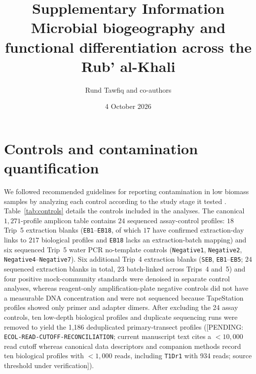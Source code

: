 \documentclass[11pt]{article}
\title{Supplementary Information\\
\large Microbial biogeography and functional differentiation across the Rub' al-Khali}
\author{Rund Tawfiq and co-authors}
\date{4 October 2026}
\begin{document}
\maketitle

\section{Controls and contamination quantification}\label{sup:controls}
We followed recommended guidelines for reporting contamination in low biomass samples by analyzing each control according to the study stage it tested \cite{fierer2025controls}. Table~\ref{tab:controls} details the controls included in the analyses. The canonical $1{,}271$-profile amplicon table contains $24$ sequenced assay-control profiles: $18$ Trip~5 extraction blanks (\texttt{EB1}--\texttt{EB18}, of which $17$ have confirmed extraction-day links to $217$ biological profiles and \texttt{EB18} lacks an extraction-batch mapping) and six sequenced Trip~5 water PCR no-template controls (\texttt{Negative1}, \texttt{Negative2}, \texttt{Negative4}--\texttt{Negative7}). Six additional Trip~4 extraction blanks (\texttt{SEB}, \texttt{EB1}--\texttt{EB5}; $24$ sequenced extraction blanks in total, $23$ batch-linked across Trips~4 and~5) and four positive mock-community standards were denoised in separate control analyses, whereas reagent-only amplification-plate negative controls did not have a measurable DNA concentration and were not sequenced because TapeStation profiles showed only primer and adapter dimers. After excluding the 24 assay controls, ten low-depth biological profiles and duplicate sequencing runs were removed to yield the 1,186 deduplicated primary-transect profiles ([PENDING: \texttt{ECOL-READ-CUTOFF-RECONCILIATION}; current manuscript text cites a $<10{,}000$ read cutoff whereas canonical data descriptors and companion methods record ten biological profiles with $<1{,}000$ reads, including \texttt{T1Dr1} with 934 reads; source threshold under verification]).
\end{document}
